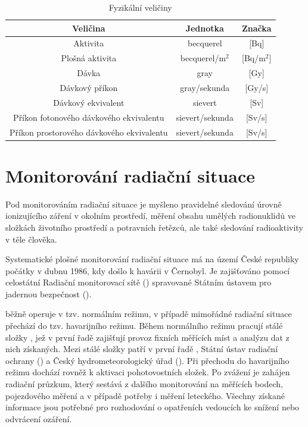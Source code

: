 \begin{itemize}
		\begin{table}[h!]
			\centering
			\caption{Fyzikální veličiny}
			\label{tab:tab_veliciny}
			\begin{tabular}{|c|c|c|}
				\hline
				\textbf{Veličina}           			& \textbf{Jednotka}  & \textbf{Značka}  \\ \hline
				Aktivita								& becquerel			 & {[}Bq{]}			\\ \hline
				Plošná aktivita							& becquerel/m$^2$	 & {[}Bq/m$^2${]}	\\ \hline
				Dávka                      	 			& gray               & {[}Gy{]}         \\ \hline
				Dávkový příkon              			& gray/sekunda		 & {[}Gy/s{]}       \\ \hline
				Dávkový ekvivalent          			& sievert            & {[}Sv{]}         \\ \hline
				Příkon fotonového dávkového ekvivalentu & sievert/sekunda	 & {[}Sv/s{]}       \\ \hline
				Příkon prostorového dávkového ekvivalentu & sievert/sekunda	 & {[}Sv/s{]}       \\ \hline
			\end{tabular}
		\end{table}
\end{itemize}

\section{Monitorování radiační situace}

Pod monitorováním radiační situace je myšleno pravidelné sledování
úrovně ionizujícího záření v okolním prostředí, měření obsahu umělých
radionuklidů ve složkách životního prostředí a potravních řetězců, ale
také sledování radioaktivity v těle člověka. \cite{monras}

Systematické plošné monitorování radiační situace má na území České
republiky počátky v dubnu 1986, kdy došlo k havárii v 
Černobyl. Je zajišťováno pomocí celostátní Radiační monitorovací sítě
() spravované Státním ústavem pro jadernou bezpečnost
().

 běžně operuje v tzv. normálním režimu, v případě mimořádné
radiační situace přechází do tzv. havarijního režimu. Během normálního
režimu pracují stálé složky , jež v první řadě zajišťují
provoz fixních měřících míst a analýzu dat z nich získaných. Mezi
stálé složky  patří v první řadě , Státní ústav
radiační ochrany () a Český hydrometeorologický úřad
(). Při přechodu do havarijního režimu dochází rovněž k
aktivaci pohotovostních složek. Po zvážení je zahájen radiační
průzkum, který sestává z dalšího monitorování na měřících bodech,
pojezdového měření a v případě potřeby i měření leteckého. \cite{suro}
Všechny získané informace jsou potřebné pro rozhodování o opatřeních
vedoucích ke snížení nebo odvrácení ozáření.

